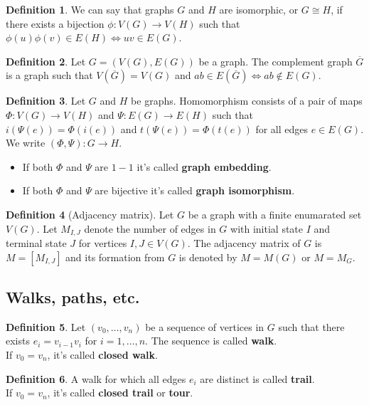 \documentclass{article}
\theoremstyle{definition}
\newtheorem{dd}{Definition}[section]
\begin{document}
\begin{dd}
    We can say that graphs $G$ and $H$ are isomorphic, or $G \cong H$, if there exists a bijection $\phi: V(G) \to V(H)$ such that $\phi(u)\phi(v) \in E(H) \iff uv \in E(G)$.
\end{dd}

\begin{dd}
    Let $G = \left( V(G), E(G) \right)$ be a graph. The complement graph $\overline{G}$ is a graph such that $V(\overline{G}) = V(G)$ and $ab \in E(\overline{G}) \iff ab \notin E(G)$.
\end{dd}

\begin{dd}
    Let $G$ and $H$ be graphs. Homomorphism consists of a pair of maps $\Phi: V(G) \to V(H)$ and $\Psi: E(G) \to E(H)$ such that $i(\Psi(e)) = \Phi(i(e))$ and $t(\Psi(e)) = \Phi(t(e))$ for all edges $e \in E(G)$. We write $(\Phi, \Psi): G \to H$.
    \begin{itemize}
        \item If both $\Phi$ and $\Psi$ are $1-1$ it's called \textbf{graph embedding}.
        \item If both $\Phi$ and $\Psi$ are bijective it's called \textbf{graph isomorphism}.
    \end{itemize}
\end{dd}

\begin{dd}[Adjacency matrix]
    Let $G$ be a graph with a finite enumarated set $V(G)$. Let $M_{I,J}$ denote the number of edges in $G$ with initial state $I$ and terminal state $J$ for vertices $I, J \in V(G)$. The adjacency matrix of $G$ is $M = [M_{I,J}]$ and its formation from $G$ is denoted by $M = M(G)$ or $M = M_G$.
\end{dd}

\subsection{Walks, paths, etc.}

\begin{dd}
    Let $(v_0, \dots, v_n)$ be a sequence of vertices in $G$ such that there exists $e_i = v_{i-1}v_i$ for $i = 1, \dots, n$. The sequence is called \textbf{walk}. \\
    If $v_0 = v_n$, it's called \textbf{closed walk}.
\end{dd}

\begin{dd}
    A walk for which all edges $e_i$ are distinct is called \textbf{trail}. \\
    If $v_0 = v_n$, it's called \textbf{closed trail} or \textbf{tour}.
\end{dd}
\end{document}

